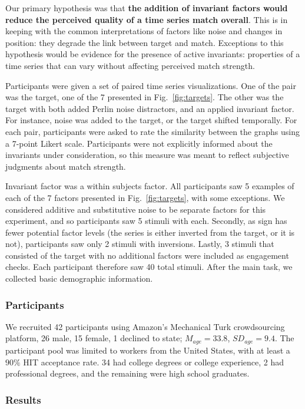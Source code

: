 Our primary hypothesis was that \textbf{the addition of invariant factors would reduce the perceived quality of a time series match overall}. This is in keeping with the common interpretations of factors like noise and changes in position: they degrade the link between target and match. Exceptions to this hypothesis would be evidence for the presence of active invariants: properties of a time series that can vary without affecting perceived match strength.

Participants were given a set of paired time series visualizations. One of the pair was the target, one of the 7 presented in Fig.~\ref{fig:targets}. The other was the target with both added Perlin noise distractors, and an applied invariant factor. For instance, noise was added to the target, or the target shifted temporally. For each pair, participants were asked to rate the similarity between the graphs using a 7-point Likert scale. Participants were not explicitly informed about the invariants under consideration, so this measure was meant to reflect subjective judgments about match strength.  

Invariant factor was a within subjects factor. All participants saw 5 examples of each of the 7 factors presented in Fig.~\ref{fig:targets}, with some exceptions. We considered additive and substitutive noise to be separate factors for this experiment, and so participants saw 5 stimuli with each. Secondly, as sign has fewer potential factor levels (the series is either inverted from the target, or it is not), participants saw only 2 stimuli with inversions. Lastly, 3 stimuli that consisted of the target with no additional factors were included as engagement checks. Each participant therefore saw 40 total stimuli. After the main task, we collected basic demographic information. 

\subsubsection{Participants}
We recruited 42 participants using Amazon's Mechanical Turk crowdsourcing platform, 26 male, 15 female, 1 declined to state; $M_{age}=33.8$, $SD_{age}=9.4$. The participant pool was limited to workers from the United States, with at least a $90\%$ HIT acceptance rate. 34 had college degrees or college experience, 2 had professional degrees, and the remaining were high school graduates.

\subsubsection{Results}


